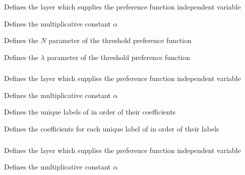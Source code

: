 {Defines the layer which supplies the preference function independent variable}

 {Defines the multiplicative constant $\alpha$}

 {Defines the $N$ parameter of the threshold preference function}

 {Defines the $\lambda$ parameter of the threshold preference function}

\subsubsection[Categorical]{}

 {Defines the layer which supplies the preference function independent variable}

 {Defines the multiplicative constant $\alpha$}

 {Defines the unique labels of  in order of their coefficients}

 {Defines the coefficients for each unique label of  in order of their labels}

\subsubsection[Monotonic categorical]{}

 {Defines the layer which supplies the preference function independent variable}

 {Defines the multiplicative constant $\alpha$}

